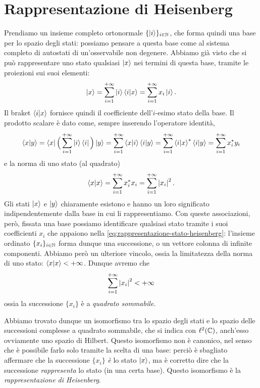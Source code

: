 \section{Rappresentazione di Heisenberg}
Prendiamo un insieme completo ortonormale $\{\left|{i}\right\rangle\}_{i\in\mathbb{N}}$, che forma quindi una base per lo spazio degli stati: possiamo pensare a questa base come al sistema completo di autostati di un'osservabile non degenere.
Abbiamo già visto che si può rappresentare uno stato qualsiasi $\left|{x}\right\rangle$ nei termini di questa base, tramite le proiezioni sui suoi elementi:
\begin{equation}
	\left|{x}\right\rangle=\sum_{{i}=1}^{+\infty}\left|{i}\right\rangle\left\langle{i}\middle|{x}\right\rangle=\sum_{{i}=1}^{+\infty}x_i\left|{i}\right\rangle.
	\label{eq:rappresentazione-stato-heisenberg}
\end{equation}
Il braket $\left\langle{i}\middle|{x}\right\rangle$ fornisce quindi il coefficiente dell'$i$-esimo stato della base.
Il prodotto scalare è dato come, sempre inserendo l'operatore identità,
\begin{equation}
	\left\langle{x}\middle|{y}\right\rangle=\left\langle{x}\right|\Big(\sum_{{i}=1}^{+\infty}\left|{i}\right\rangle\left\langle{i}\right|\Big)\left|{y}\right\rangle=\sum_{{i}=1}^{+\infty}\left\langle{x}\middle|{i}\right\rangle\left\langle{i}\middle|{y}\right\rangle=\sum_{{i}=1}^{+\infty}\left\langle{i}\middle|{x}\right\rangle^*\left\langle{i}\middle|{y}\right\rangle=\sum_{{i}=1}^{+\infty}x_i^*y_i
	\label{eq:prodotto-scalare}
\end{equation}
e la norma di uno stato (al quadrato)
\begin{equation}
	\left\langle{x}\middle|{x}\right\rangle=\sum_{{i}=1}^{+\infty}x_i^*x_i=\sum_{{i}=1}^{+\infty}\left|{x_i}\right|^2.
	\label{eq:norma-stato}
\end{equation}
Gli stati $\left|{x}\right\rangle$ e $\left|{y}\right\rangle$ chiaramente esistono e hanno un loro significato indipendentemente dalla base in cui li rappresentiamo.
Con queste associazioni, però, fissata una base possiamo identificare qualsiasi stato tramite i suoi coefficienti $x_i$ che appaiono nella \eqref{eq:rappresentazione-stato-heisenberg}: l'insieme ordinato $\{x_i\}_{i\in\mathbb{N}}$ forma dunque una successione, o un vettore colonna di infinite componenti.
Abbiamo però un ulteriore vincolo, ossia la limitatezza della norma di uno stato: $\left\langle{x}\middle|{x}\right\rangle<+\infty$.
Dunque avremo che
\begin{equation}
	\sum_{{i}=1}^{+\infty}\left|{x_i}\right|^2<+\infty
	\label{eq:successione-quadrato-sommabile}
\end{equation}
ossia la successione $\{x_i\}$ è a \emph{quadrato sommabile}.

Abbiamo trovato dunque un isomorfismo tra lo spazio degli stati e lo spazio delle successioni complesse a quadrato sommabile, che si indica con $\ell^2(\mathbb{C})$, anch'esso ovviamente uno spazio di Hilbert.
Questo isomorfismo non è canonico, nel senso che è possibile farlo solo tramite la scelta di una base: perciò è sbagliato affermare che la successione $\{x_i\}$ \emph{è} lo stato $\left|{x}\right\rangle$, ma è corretto dire che la successione \emph{rappresenta} lo stato (in una certa base).
Questo isomorfismo è la \emph{rappresentazione di Heisenberg}.

